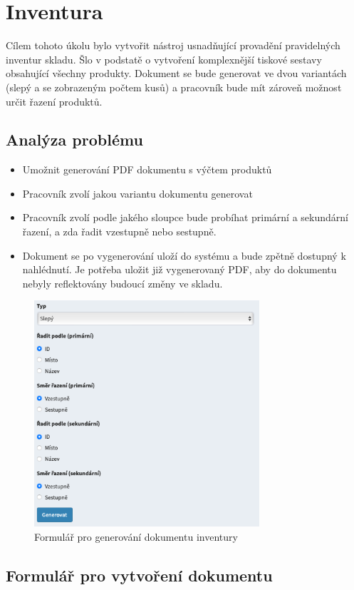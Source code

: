 \section{Inventura}

Cílem tohoto úkolu bylo vytvořit nástroj usnadňující provadění pravidelných inventur skladu. Šlo v podstatě o vytvoření komplexnější tiskové sestavy obsahující všechny produkty. Dokument se bude generovat ve dvou variantách (slepý a se zobrazeným počtem kusů) a pracovník bude mít zároveň možnost určit řazení produktů.

\subsection{Analýza problému}

\begin{itemize}
    \item Umožnit generování PDF dokumentu s výčtem produktů
    \item Pracovník zvolí jakou variantu dokumentu generovat
    \item Pracovník zvolí podle jakého sloupce bude probíhat primární a sekundární řazení, a zda řadit vzestupně nebo sestupně.
    \item Dokument se po vygenerování uloží do systému a bude zpětně dostupný k nahlédnutí. Je potřeba uložit již vygenerovaný PDF, aby do dokumentu nebyly reflektovány budoucí změny ve skladu.
\end{itemize}

\begin{figure}
    \centering
    \includegraphics[width=0.5\linewidth]{Figures/inventura-pdf.png}
    \caption{Formulář pro generování dokumentu inventury}
    \label{fig:enter-label}
\end{figure}

\subsection{Formulář pro vytvoření dokumentu}

